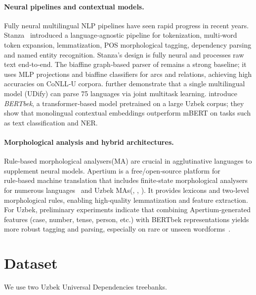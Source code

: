 \documentclass[runningheads]{llncs}
\begin{document}
\paragraph{Neural pipelines and contextual models.}
Fully neural multilingual NLP pipelines have seen rapid progress in recent years.  Stanza~\cite{Qi2020-zr} introduced a language‑agnostic pipeline for tokenization, multi‑word token expansion, lemmatization, POS morphological tagging, dependency parsing and named entity recognition.   Stanza’s design is fully neural and processes raw text end‑to‑end.  The biaffine graph‑based parser of \cite{DBLP:conf/iclr/DozatM17} remains a strong baseline; it uses MLP projections and biaffine classifiers for arcs and relations, achieving high accuracies on CoNLL‑U corpora.  \cite{kondratyuk-straka-2019-75} further demonstrate that a single multilingual model (UDify) can parse 75 languages via joint multitask learning.   \cite{kuriyozov-etal-2024-bertbek} introduce \textit{BERTbek}, a transformer‑based model pretrained on a large Uzbek corpus; they show that monolingual contextual embeddings outperform mBERT on tasks such as text classification and NER.

\paragraph{Morphological analysis and hybrid architectures.}
Rule‑based morphological analysers(MA) are crucial in agglutinative languages to supplement neural models.  Apertium is a free/open‑source platform for rule‑based machine translation that includes finite‑state morphological analysers for numerous languages~\cite{Forcada2011} and Uzbek MAs(\cite{Salaev2024}, \cite{2301.12711}, \cite{MURZINTCEV2026100195}).  It provides lexicons and two‑level morphological rules, enabling high‑quality lemmatization and feature extraction.   For Uzbek, preliminary experiments indicate that combining Apertium‑generated features (case, number, tense, person, etc.) with BERTbek representations yields more robust tagging and parsing, especially on rare or unseen wordforms~\cite{kuriyozov-etal-2024-bertbek}.

\section{Dataset}
\label{sec:dataset}
We use two Uzbek Universal Dependencies treebanks.
\end{document}
